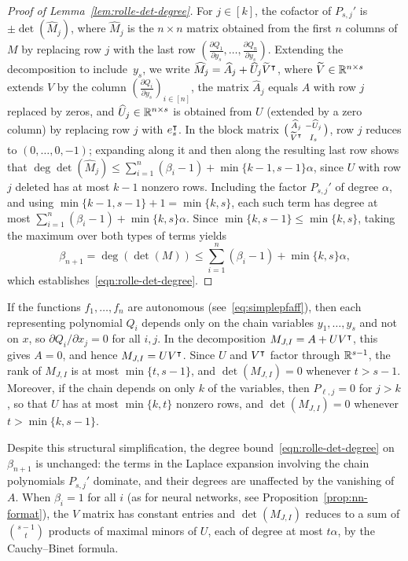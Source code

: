 \begin{proof}[Proof of Lemma~\ref{lem:rolle-det-degree}]
For $j\in [k]$, the cofactor of $P_{s,j}'$ is $\pm\det(\widehat{M}_j)$, where $\widehat{M}_j$ is the $n\times n$ matrix obtained from the first $n$ columns of $M$ by replacing row $j$ with the last row $(\frac{\partial Q_1}{\partial y_s},\dots,\frac{\partial Q_n}{\partial y_s})$. Extending the decomposition to include~$y_s$, we write $\widehat{M}_j = \widehat{A}_j + \widehat{U}_j\widetilde{V}^\intercal$, where $\widetilde{V}\in \mathbb{R}^{n\times s}$ extends $V$ by the column $(\frac{\partial Q_i}{\partial y_s})_{i\in [n]}$, the matrix $\widehat{A}_j$ equals $A$ with row $j$ replaced by zeros, and $\widehat{U}_j\in \mathbb{R}^{n\times s}$ is obtained from $U$ (extended by a zero column) by replacing row $j$ with $e_s^\intercal$. In the block matrix $\bigl(\begin{smallmatrix} \widehat{A}_j & -\widehat{U}_j \\ \widetilde{V}^\intercal & I_s\end{smallmatrix}\bigr)$, row $j$ reduces to $(0,\dots,0,-1)$; expanding along it and then along the resulting last row shows that $\deg\det(\widehat{M}_j) \le \sum_{i=1}^n(\beta_i - 1) + \min\{k-1,s-1\}\alpha$, since $U$ with row $j$ deleted has at most $k-1$ nonzero rows. Including the factor $P_{s,j}'$ of degree $\alpha$, and using $\min\{k-1,s-1\}+1 = \min\{k,s\}$, each such term has degree at most $\sum_{i=1}^n(\beta_i-1)+\min\{k,s\}\alpha$. Since $\min\{k,s-1\} \le \min\{k,s\}$, taking the maximum over both types of terms yields
\begin{equation*}
  \beta_{n+1} = \deg(\det(M)) \le \sum_{i=1}^n (\beta_i - 1) + \min\{k, s\}\alpha,
\end{equation*}
which establishes~\eqref{eqn:rolle-det-degree}.
\end{proof}

\begin{remark}\label{rem:autonomous-rolle}
  If the functions $f_1,\dots,f_n$ are autonomous (see~\eqref{eq:simplepfaff}), then each representing polynomial $Q_i$ depends only on the chain variables $y_1,\dots,y_s$ and not on $x$, so $\partial Q_i/\partial x_j = 0$ for all $i, j$. In the decomposition $M_{J,I} = A + UV^\intercal$, this gives $A = 0$, and hence $M_{J,I} = UV^\intercal$. Since $U$ and $V^\intercal$ factor through $\mathbb{R}^{s-1}$, the rank of $M_{J,I}$ is at most $\min\{t, s-1\}$, and $\det(M_{J,I}) = 0$ whenever $t > s - 1$. Moreover, if the chain depends on only $k$ of the variables, then $P_{\ell,j} = 0$ for $j > k$, so that $U$ has at most $\min\{k, t\}$ nonzero rows, and $\det(M_{J,I}) = 0$ whenever $t > \min\{k, s-1\}$.

  Despite this structural simplification, the degree bound~\eqref{eqn:rolle-det-degree} on $\beta_{n+1}$ is unchanged: the terms in the Laplace expansion involving the chain polynomials $P_{s,j}'$ dominate, and their degrees are unaffected by the vanishing of $A$. When $\beta_i = 1$ for all $i$ (as for neural networks, see Proposition~\ref{prop:nn-format}), the $V$ matrix has constant entries and $\det(M_{J,I})$ reduces to a sum of $\binom{s-1}{t}$ products of maximal minors of $U$, each of degree at most $t\alpha$, by the Cauchy--Binet formula.
\end{remark}

